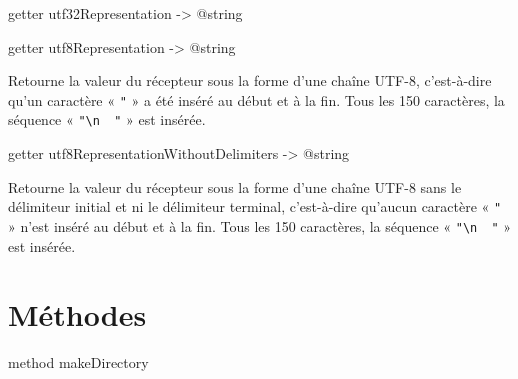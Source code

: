 
\begin{galgasbox}
getter utf32Representation -> @string
\end{galgasbox}
















\begin{galgasbox}
getter utf8Representation -> @string
\end{galgasbox}

Retourne la valeur du récepteur sous la forme d'une chaîne UTF-8, c'est-à-dire qu'un caractère « \texttt{"} » a été inséré au début et à la fin. Tous les 150 caractères, la séquence « \texttt{"\textbackslash n~~"} » est insérée.









\begin{galgasbox}
getter utf8RepresentationWithoutDelimiters -> @string
\end{galgasbox}

Retourne la valeur du récepteur sous la forme d'une chaîne UTF-8 sans le délimiteur initial et ni le délimiteur terminal, c'est-à-dire qu'aucun caractère « \texttt{"} » n'est inséré au début et à la fin. Tous les 150 caractères, la séquence « \texttt{"\textbackslash n~~"} » est insérée.














\section{Méthodes}






\begin{galgasbox}
method makeDirectory
\end{galgasbox}

